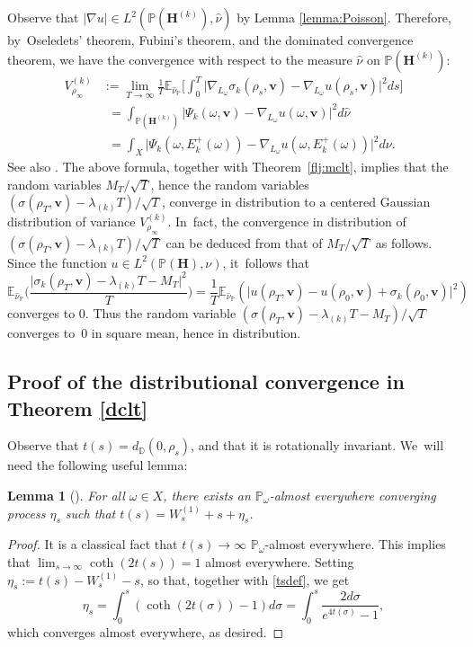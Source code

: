 \documentclass[10pt]{amsart}
\theoremstyle{plain}
\newtheorem{lemma}[thm]{Lemma}
\theoremstyle{definition}
\numberwithin{equation}{subsection}
\newcommand\bD{\mathbb{D}}
\newcommand\bE{\mathbb{E}}
\newcommand\bP{\mathbb{P}}
\let\gradient\nabla
\newcommand{\bfH}{\boldsymbol{H}}
\newcommand{\bfv}{\boldsymbol{v}}
\newcommand{\bbE}[1]{\bE_{\hat{\nu}_\bP}\biggl[ #1 \biggr]}
\newcommand{\defeq}{:=}
\begin{document}
Observe that $|\gradient u| \in L^2(\bP(\bfH^{(k)}),\hat\nu)$ by Lemma \ref{lemma:Poisson}.
Therefore, by~Oseledets’ theorem, Fubini's theorem, and the dominated convergence theorem, we have the convergence with respect to the measure $\hat{\nu}$ on $\bP(\bfH^{(k)})$:
\begin{equation}
\label{variance}
\begin{aligned}
V^{(k)}_{\rho_\infty} &\defeq \lim_{T\to\infty} \frac{1}{T}\bbE{\int_0^T \bigl| \gradient_{L_\omega}\sigma_k(\rho_s,{\bfv})- \gradient_{L_\omega}u(\rho_s,{\bfv}) \bigr|^2ds} \\
&\phantom{:}= \int_{\bP(\bfH^{(k)})} \bigl |\Psi_k (\omega,{\bfv})-\gradient_{L_\omega}u(\omega,\bfv) \bigr|^2d \hat{\nu} \\
&\phantom{:}=\int_{X} \bigl |\Psi_k (\omega,E^+_k(\omega)) -
\gradient_{L_\omega}u(\omega,E^+_k(\omega)) \bigr|^2d \nu.\end{aligned}
\end{equation}
See also \cite[Cor.\,5.5]{For02}. The above formula, together with Theorem~\ref{flj:mclt}, implies that the random variables $M_T/ \sqrt{T}$, hence the random variables
$(\sigma(\rho_T,{\bfv}) -\lambda_{(k)} T)/\sqrt{T}$, converge in distribution to a centered Gaussian distribution of variance $V^{(k)}_{\rho_\infty}$. In~fact, the convergence in distribution of $(\sigma(\rho_T,{\bfv}) -\lambda_{(k)} T)/\sqrt{T}$ can be deduced from that of $M_T/ \sqrt{T}$
as follows. Since the function $u \in L^2(\bP(\bfH),\nu)$, it~follows that
\[
\bE_{{\hat{\nu}_\bP}} \Big(\frac{\vert \sigma_k(\rho_T,{\bfv}) -\lambda_{(k)} T - M_T\vert^2}{T}\Big) = \frac{1}{T} \bE_{{\hat{\nu}_\bP}}(\vert u(\rho_T, \bfv)- u(\rho_0, \bfv) + \sigma_k(\rho_0, \bfv)\vert^2)
\]
converges to $0$. Thus the random variable $(\sigma(\rho_T,{\bfv}) -\lambda_{(k)} T -M_T)/\sqrt{T}$ converges to~$0$ in square mean,
hence in distribution. \hfill\qedsymbol

\subsection{Proof of the distributional convergence in Theorem \ref{dclt}}

Observe that $t(s) = d_{\bD}(0,\rho_s)$, and that it is rotationally invariant. We~will need the following useful lemma:

\begin{lemma}[{\cite[Lem.\,VII.7.2.1]{FL12}}]\label{LFL}
For all $\omega \in X$, there exists an $\bP_\omega$-almost everywhere converging process $\eta_s$ such that $t(s) = W_s^{(1)} + s+\eta_s$.
\end{lemma}
\begin{proof}
It is a classical fact that $t(s)\to\infty$ $\bP_\omega$-almost everywhere. This implies that $\lim_{s\to\infty} \coth (2t(s)) = 1$ almost everywhere. Setting $\eta_s \defeq t(s) - W_s^{(1)} - s$, so that, together with \eqref{tsdef}, we get
\[
\eta_s = \int_{0}^s (\coth(2t(\sigma)) -1)d\sigma = \int_{0}^s \frac{2d\sigma}{e^{4t(\sigma)} -1},
\] which converges almost everywhere, as desired.
\end{proof}
\end{document}
